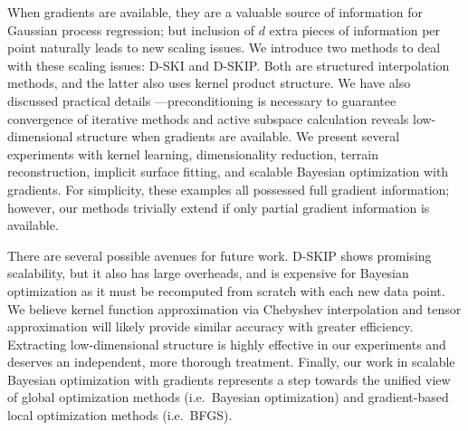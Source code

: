 When gradients are available, they are a valuable source of information for
Gaussian process regression; but inclusion of $d$ extra pieces of information
per point naturally leads to new scaling issues. We introduce two methods to
deal with these scaling issues: D-SKI and D-SKIP. Both are structured
interpolation methods, and the latter also uses kernel product structure. We
have also discussed practical details ---preconditioning is necessary to
guarantee convergence of iterative methods and active subspace calculation
reveals low-dimensional structure when gradients are available. We present
several experiments with kernel learning, dimensionality reduction, terrain
reconstruction, implicit surface fitting, and scalable Bayesian optimization
with gradients. For simplicity, these examples all possessed full gradient
information; however, our methods trivially extend if only partial gradient
information is available.

There are several possible avenues for future work. D-SKIP shows promising
scalability, but it also has large overheads, and is expensive for Bayesian
optimization as it must be recomputed from scratch with each new data point. We
believe kernel function approximation via Chebyshev interpolation and tensor
approximation will likely provide similar accuracy with greater efficiency.
Extracting low-dimensional structure is highly effective in our experiments and
deserves an independent, more thorough treatment. Finally, our work in scalable
Bayesian optimization with gradients represents a step towards the unified view
of global optimization methods (i.e.~Bayesian optimization) and
gradient-based local optimization methods (i.e.~BFGS).